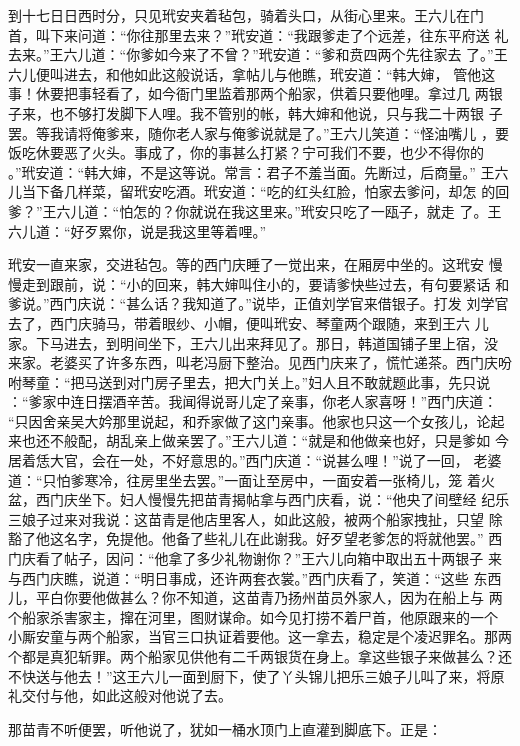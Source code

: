 到十七日日西时分，只见玳安夹着毡包，骑着头口，从街心里来。王六儿在门
首，叫下来问道：“你往那里去来？”玳安道：“我跟爹走了个远差，往东平府送
礼去来。”王六儿道：“你爹如今来了不曾？”玳安道：“爹和贲四两个先往家去
了。”王六儿便叫进去，和他如此这般说话，拿帖儿与他瞧，玳安道：“韩大婶，
管他这事！休要把事轻看了，如今衙门里监着那两个船家，供着只要他哩。拿过几
两银子来，也不够打发脚下人哩。我不管别的帐，韩大婶和他说，只与我二十两银
子罢。等我请将俺爹来，随你老人家与俺爹说就是了。”王六儿笑道：“怪油嘴儿
，要饭吃休要恶了火头。事成了，你的事甚么打紧？宁可我们不要，也少不得你的
。”玳安道：“韩大婶，不是这等说。常言：君子不羞当面。先断过，后商量。”
王六儿当下备几样菜，留玳安吃酒。玳安道：“吃的红头红脸，怕家去爹问，却怎
的回爹？”王六儿道：“怕怎的？你就说在我这里来。”玳安只吃了一瓯子，就走
了。王六儿道：“好歹累你，说是我这里等着哩。”

玳安一直来家，交进毡包。等的西门庆睡了一觉出来，在厢房中坐的。这玳安
慢慢走到跟前，说：“小的回来，韩大婶叫住小的，要请爹快些过去，有句要紧话
和爹说。”西门庆说：“甚么话？我知道了。”说毕，正值刘学官来借银子。打发
刘学官去了，西门庆骑马，带着眼纱、小帽，便叫玳安、琴童两个跟随，来到王六
儿家。下马进去，到明间坐下，王六儿出来拜见了。那日，韩道国铺子里上宿，没
来家。老婆买了许多东西，叫老冯厨下整治。见西门庆来了，慌忙递茶。西门庆吩
咐琴童：“把马送到对门房子里去，把大门关上。”妇人且不敢就题此事，先只说
：“爹家中连日摆酒辛苦。我闻得说哥儿定了亲事，你老人家喜呀！”西门庆道：
“只因舍亲吴大妗那里说起，和乔家做了这门亲事。他家也只这一个女孩儿，论起
来也还不般配，胡乱亲上做亲罢了。”王六儿道：“就是和他做亲也好，只是爹如
今居着恁大官，会在一处，不好意思的。”西门庆道：“说甚么哩！”说了一回，
老婆道：“只怕爹寒冷，往房里坐去罢。”一面让至房中，一面安着一张椅儿，笼
着火盆，西门庆坐下。妇人慢慢先把苗青揭帖拿与西门庆看，说：“他央了间壁经
纪乐三娘子过来对我说：这苗青是他店里客人，如此这般，被两个船家拽扯，只望
除豁了他这名字，免提他。他备了些礼儿在此谢我。好歹望老爹怎的将就他罢。”
西门庆看了帖子，因问：“他拿了多少礼物谢你？”王六儿向箱中取出五十两银子
来与西门庆瞧，说道：“明日事成，还许两套衣裳。”西门庆看了，笑道：“这些
东西儿，平白你要他做甚么？你不知道，这苗青乃扬州苗员外家人，因为在船上与
两个船家杀害家主，撺在河里，图财谋命。如今见打捞不着尸首，他原跟来的一个
小厮安童与两个船家，当官三口执证着要他。这一拿去，稳定是个凌迟罪名。那两
个都是真犯斩罪。两个船家见供他有二千两银货在身上。拿这些银子来做甚么？还
不快送与他去！”这王六儿一面到厨下，使了丫头锦儿把乐三娘子儿叫了来，将原
礼交付与他，如此这般对他说了去。

那苗青不听便罢，听他说了，犹如一桶水顶门上直灌到脚底下。正是：

